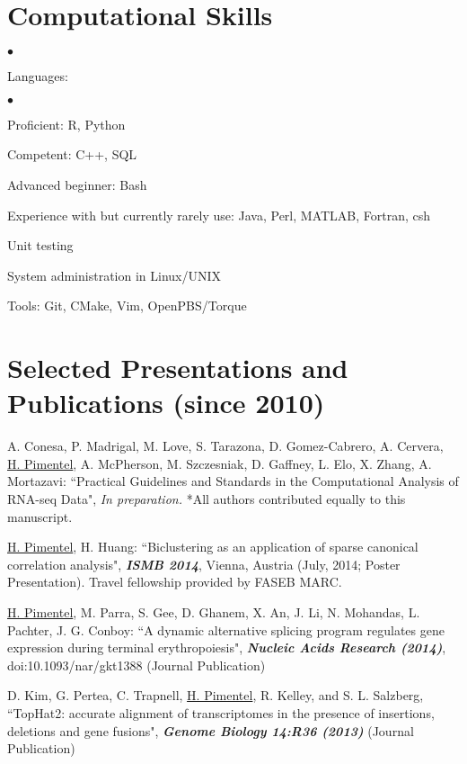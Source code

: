 \documentclass[margin,line]{res}
\newenvironment{list2}{
  \begin{list}{$\bullet$}{%
      \setlength{\itemsep}{0in}
      \setlength{\parsep}{0in} \setlength{\parskip}{0in}
      \setlength{\topsep}{0in} \setlength{\partopsep}{0in}
      \setlength{\leftmargin}{0.2in}}}{\end{list}}
\begin{document}
\begin{resume}
\section{\sc Computational Skills}
\begin{list2}
\item Languages:
  \begin{list2}
    \item Proficient: R, Python
    \item Competent: C++, SQL
    \item Advanced beginner: Bash
    \item Experience with but currently rarely use: Java, Perl, MATLAB, Fortran, csh
  \end{list2}
\item Unit testing
\item System administration in Linux/UNIX
\item Tools: Git, CMake, Vim, OpenPBS/Torque\\
\end{list2}
\vspace{-.65cm}

\section{\sc Selected Presentations and Publications (since 2010)}

A. Conesa, P. Madrigal, M. Love, S. Tarazona, D. Gomez-Cabrero, A. Cervera,
\underline{H. Pimentel}, A. McPherson, M. Szczesniak, D. Gaffney, L. Elo, X.
Zhang, A. Mortazavi: ``Practical Guidelines and Standards in the Computational
Analysis of RNA-seq Data", {\emph{In preparation.}} *All authors contributed
equally to this manuscript.

\underline{H. Pimentel}, H. Huang: ``Biclustering as an application of sparse
canonical correlation analysis", {\bf \emph{ISMB 2014}}, Vienna, Austria (July,
2014; Poster Presentation). Travel fellowship provided by FASEB MARC.

\underline{H. Pimentel}, M. Parra, S. Gee, D. Ghanem, X. An, J. Li, N.
Mohandas, L. Pachter, J. G. Conboy: ``A dynamic alternative splicing program
regulates gene expression during terminal erythropoiesis", {\bf \emph{Nucleic
    Acids Research (2014)}}, doi:10.1093/nar/gkt1388 (Journal Publication)

D. Kim, G. Pertea, C. Trapnell, \underline{H. Pimentel}, R. Kelley, and S.
L. Salzberg, ``TopHat2: accurate alignment of transcriptomes in the presence of
insertions, deletions and gene fusions", {\bf \emph{Genome Biology
    14:R36 (2013)}} (Journal Publication)


\end{resume}
\end{document}
